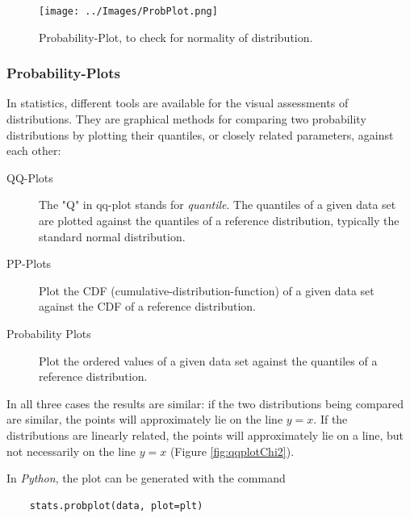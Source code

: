 \begin{figure}
  \centering
  \texttt{[image: ../Images/ProbPlot.png]}\\
  \caption{Probability-Plot, to check for normality of distribution.}\label{fig:qqplot}
\end{figure}


\subsubsection{Probability-Plots} 

In statistics, different tools are available for the visual assessments of distributions. They are graphical methods for comparing two probability distributions by plotting their \glspl{quantile}, or closely related parameters, against each other:

\begin{description}
  \item[QQ-Plots] The "Q" in \acrfull{qq-plot} stands for \emph{quantile}. The quantiles of a given data set are plotted against the quantiles of a reference distribution, typically the standard normal distribution.
  \item[PP-Plots]  Plot the CDF (cumulative-distribution-function) of a given data set against the CDF of a reference distribution.
  \item[Probability Plots]  Plot the ordered values of a given data set against the quantiles of a reference distribution.
\end{description}

In all three cases the results are similar: if the two distributions being compared are similar, the points will approximately lie on the line $y = x$. If the distributions are linearly related, the points will approximately lie on a line, but not necessarily on the line $y = x$ (Figure \ref{fig:qqplotChi2}).

In \emph{Python}, the plot can be generated with the command

\begin{lstlisting}
    stats.probplot(data, plot=plt)
\end{lstlisting}

